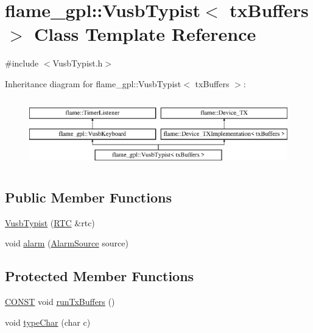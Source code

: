 \hypertarget{classflame__gpl_1_1_vusb_typist}{\section{flame\-\_\-gpl\-:\-:Vusb\-Typist$<$ tx\-Buffers $>$ Class Template Reference}
\label{classflame__gpl_1_1_vusb_typist}
}


{\ttfamily \#include $<$Vusb\-Typist.\-h$>$}

Inheritance diagram for flame\-\_\-gpl\-:\-:Vusb\-Typist$<$ tx\-Buffers $>$\-:\begin{figure}[H]
\begin{center}
\leavevmode
\includegraphics[height=3.000000cm]{classflame__gpl_1_1_vusb_typist}
\end{center}
\end{figure}
\subsection*{Public Member Functions}
\begin{DoxyCompactItemize}
\item 
\hyperlink{classflame__gpl_1_1_vusb_typist_acbf3098e89832c0b07904fc36f935e54}{Vusb\-Typist} (\hyperlink{classflame_1_1_r_t_c}{R\-T\-C} \&rtc)
\item 
void \hyperlink{classflame__gpl_1_1_vusb_typist_afc57a75f932afa7202b7c1aee92d9a0b}{alarm} (\hyperlink{namespaceflame_a6d176ba245556716fd3e32006bb7cfe5}{Alarm\-Source} source)
\end{DoxyCompactItemize}
\subsection*{Protected Member Functions}
\begin{DoxyCompactItemize}
\item 
\hyperlink{io_8h_a0c33b494a68ce28497e7ce8e5e95feff}{C\-O\-N\-S\-T} void \hyperlink{classflame__gpl_1_1_vusb_typist_a725357253d37d28f66cbf2c608fefad7}{run\-Tx\-Buffers} ()
\item 
void \hyperlink{classflame__gpl_1_1_vusb_typist_a122b275feefa5c1379910056ca81bc54}{type\-Char} (char c)
\end{DoxyCompactItemize}
